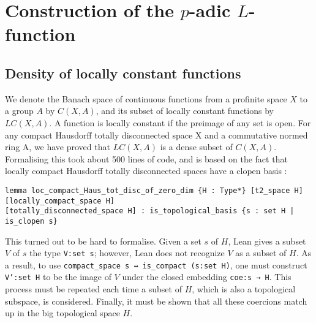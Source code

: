 \documentclass[a4paper,UKenglish,cleveref, autoref, thm-restate]{lipics-v2021}
\newcommand{\lean}[1]{\texttt{#1}\xspace} %
\begin{document}
\section{Construction of the $p$-adic $L$-function}
\label{section3}
\subsection{Density of locally constant functions}
We denote the Banach space of continuous functions from a profinite space $X$ to a group $A$ by $C(X, A)$, 
and its subset of locally constant functions by $LC(X, A)$. A function is locally constant if the preimage of any set is open. 
For any compact Hausdorff totally disconnected space X and a commutative
normed ring A, we have proved that $LC(X, A)$ is a dense subset of $C(X, A)$. 
Formalising this took about 500 lines of code, and is based on the fact that locally compact Hausdorff
totally disconnected spaces have a clopen basis :
\begin{lstlisting}
lemma loc_compact_Haus_tot_disc_of_zero_dim {H : Type*} [t2_space H] [locally_compact_space H] 
[totally_disconnected_space H] : is_topological_basis {s : set H | is_clopen s}
\end{lstlisting}
This turned out to be hard to formalise. Given a set $s$ of $H$, Lean gives a subset $V$ of $s$ 
the type \lean{V:set s}; however, Lean does not recognize $V$ as a subset of $H$. As a result, 
to use \lean{compact\_space s ↔ is\_compact (s:set H)}, one must construct \lean{V':set H} 
to be the image of $V$ under the closed embedding \lean{coe:s → H}. This process must be repeated each time a subset of $H$, 
which is also a topological subspace, is considered. Finally, it must be shown that all these coercions match up in the big 
topological space $H$.
\end{document}
